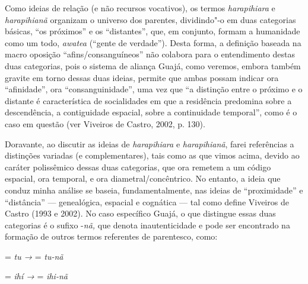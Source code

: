 Como ideias de relação (e não recursos vocativos), os termos
\emph{harapihiara} e \emph{harapihianã} organizam o universo dos
parentes, dividindo"-o em duas categorias básicas, ``os próximos'' e os
``distantes'', que, em conjunto, formam a humanidade como um todo,
\emph{awatea} (``gente de verdade''). Desta forma, a definição baseada na
macro oposição ``afins/consanguíneos'' não colabora para o entendimento
destas duas categorias, pois o sistema de aliança Guajá, como veremos,
embora também gravite em torno dessas duas ideias, permite que ambas
possam indicar ora ``afinidade'', ora ``consanguinidade'', uma vez que ``a
distinção entre o próximo e o distante é característica de socialidades
em que a residência predomina sobre a descendência, a contiguidade
espacial, sobre a continuidade temporal'', como é o caso em questão (ver
Viveiros de Castro, 2002, p. 130).

Doravante, ao discutir as ideias de \emph{harapihiara} e
\emph{harapihianã}, farei referências a distinções variadas (e
complementares), tais como as que vimos acima, devido ao caráter
polissêmico dessas duas categorias, que ora remetem a um código
espacial, ora temporal, e ora diametral/concêntrico. No entanto, a ideia
que conduz minha análise se baseia, fundamentalmente, nas ideias de
``proximidade'' e ``distância'' --- genealógica, espacial e cognática --- tal
como define Viveiros de Castro (1993 e 2002). No caso específico Guajá,
o que distingue essas duas categorias é o sufixo -\emph{nã,} que denota
inautenticidade e pode ser encontrado na formação de outros termos
referentes de parentesco, como:

\begin{center}
 = \emph{tu} \emph{→}  = \emph{tu-nã}\medskip

 = \emph{ihí →}  = \emph{ihi-nã}
\end{center}

